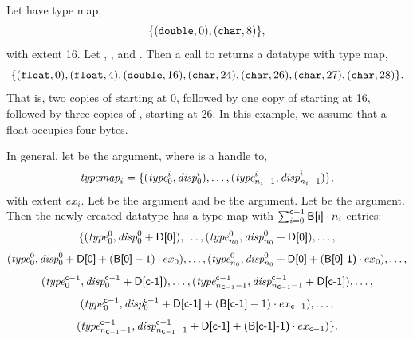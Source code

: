 \begin{example}
\label{pt2pt-exV}
%
%
Let  have type map,
\[
\{ (\ctype{double}, 0), (\ctype{char}, 8) \} ,
\]
with extent 16.
Let , ,
and .  Then a call to
 returns
a datatype with type map,
\begin{displaymath}
\{
(\ctype{float}, 0), (\ctype{float}, 4), (\ctype{double}, 16), (\ctype{char},
24), (\ctype{char}, 26), (\ctype{char}, 27), (\ctype{char}, 28)
\} .
\end{displaymath}
That is, two copies of  starting at 0, followed by
one copy of  starting at 16, followed by three copies of
, starting at 26.
In this example, we assume that a float occupies four bytes.
\end{example}

In general,
let  be the  argument, where 
is a handle to,
\begin{displaymath}
\textrm{\itshape{typemap}}_i = \{ (\textrm{\itshape{type}}_0^i , \textrm{\itshape{disp}}_0^i ) , \ldots , (\textrm{\itshape{type}}_{n_{i}-1}^i ,
\textrm{\itshape{disp}}_{n_{i}-1}^i ) \} ,
\end{displaymath}
with extent $ex_i$.
Let
 be the  argument and  be
the  argument.  %
Let  be the
 argument.
Then the newly created datatype has a type map with
$\sum_{i=0}^{\mscode{c}-1}\mpiarg{B[i]} \cdot n_i$
entries:
\begin{displaymath}
\{
(\mword{type}_0^0 , \mword{disp}_0^0 +\mpiarg{D[0]}) , \ldots , (\mword{type}_{n_0}^0 , \mword{disp}_{n_0}^0 +
\mpiarg{D[0]} ) ,
\ldots ,
\end{displaymath}
\begin{displaymath}
(\mword{type}_0^0 , \mword{disp}_0^0 + \mpiarg{D[0]} + (\mpiarg{B[0]}-1) \cdot ex_0 ) , \ldots
,
(\mword{type}_{n_0}^0 , \mword{disp}_{n_0}^0 + \mpiarg{D[0]} + (\mpiarg{B[0]-1)} \cdot
ex_0 )
, \ldots ,
\end{displaymath}
\begin{displaymath}
(\mword{type}_0^{\mscode{c}-1} , \mword{disp}_0^{\mscode{c}-1} +\mpiarg{D[c-1]}) , \ldots ,
(\mword{type}_{{n_{\mscode{c}-1}}-1}^{\mscode{c}-1} ,
\mword{disp}_{{n_{\mscode{c}-1}}-1}^{\mscode{c}-1} + \mpiarg{D[c-1]} ) ,
\ldots ,
\end{displaymath}
\begin{displaymath}
(\mword{type}_0^{\mscode{c}-1} , \mword{disp}_0^{\mscode{c}-1} +
\mpiarg{D[c-1]} + (\mpiarg{B[c-1]}-1) \cdot ex_{\mscode{c}-1} ) ,
\ldots ,
\end{displaymath}
\begin{displaymath}
(\mword{type}_{{n_{\mscode{c}-1}}-1}^{\mscode{c}-1} ,
\mword{disp}_{{n_{\mscode{c}-1}}-1}^{\mscode{c}-1} + \mpiarg{D[c-1]} +
(\mpiarg{B[c-1]-1)} \cdot ex_{\mscode{c}-1} )
\} .
\end{displaymath}

